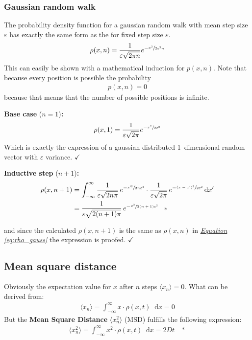 \documentclass[a4paper, parskip=half]{scrartcl}
\newcommand{\effect}[1]{%
	\textbf{#1}%
}
\newcommand{\diff}{\mathop{}\!\mathrm{d}}
\newcommand{\myEqRef}[1]{\textit{\hyperref[eq:#1]{Equation \ref*{eq:#1}}}}
\newcommand{\myEqLabel}[1]{\label{eq:#1}}
\newcommand{\myEqAnnex}[1]{\;\;\;\ast \myEqLabel{#1}}
\begin{document}
\subsubsection{Gaussian random walk}
The probability density function for a gaussian random walk with mean step size $\varepsilon$ has exactly the same form as the for fixed step size $\varepsilon$.
\begin{align}
\rho(x,n) = \frac{1}{\varepsilon\sqrt{2\pi n}} e^{-\sfrac{x^2}{2\varepsilon^2 n}} \myEqLabel{rho_gauss}
\end{align}
This can easily be shown with a mathematical induction for $p(x,n)$. Note that because every position is possible the probability 
\begin{align}
p(x,n) = 0 
\end{align}
because that means that the number of possible positions is infinite.

\textbf{Base case} ($n = 1$)\textbf{:}
\begin{align}
\rho(x,1) = \frac{1}{\varepsilon\sqrt{2\pi}} e^{-\sfrac{x^2}{2\varepsilon^2}}
\end{align}
Which is exactly the expression of a gaussian distributed 1--dimensional random vector with $\varepsilon$ variance. $\checkmark$

\textbf{Inductive step} ($n + 1$)\textbf{:}
\begin{align}
\rho(x,n+1) &= \int_{-\infty}^\infty \frac{1}{\varepsilon\sqrt{2n\pi}}\, e^{-\sfrac{x'^2}{2n\varepsilon^2}} \cdot \frac{1}{\varepsilon\sqrt{2\pi}}\, e^{-\sfrac{(x - x')^2}{2\varepsilon^2}} \diff x'\\
&= \frac{1}{\varepsilon\sqrt{2(n+1)\pi}}\, e^{-\sfrac{x^2}{2(n+1)\varepsilon^2}} \myEqAnnex{gauss_random_walk}
\end{align}

and since the calculated $\rho(x,n+1)$ is the same as $\rho(x,n)$ in \myEqRef{rho_gauss} the expression is proofed. $\checkmark$
\subsection{Mean square distance}
Obviously the expectation value for $x$ after $n$ steps $\langle x_n\rangle = 0$. What can be derived from:
\begin{align}
\langle x_n\rangle = \int_{-\infty}^\infty x \cdot \rho(x,t)\diff x = 0
\end{align}
But the \effect{Mean Square Distance} $\langle x_n^2\rangle$ (MSD) fulfills the following expression:
\begin{align}
\langle x_n^2\rangle = \int_{-\infty}^\infty x^2 \cdot \rho(x,t)\diff x = 2 D t \myEqAnnex{MSD}
\end{align}
\end{document}
